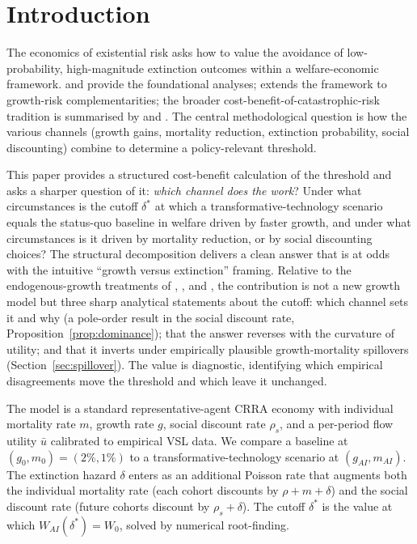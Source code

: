 \documentclass{_latex/house}
\begin{document}
\section{Introduction}
\label{sec:intro}

The economics of existential risk asks how to value the avoidance of low-probability, high-magnitude extinction outcomes within a welfare-economic framework. \citet{aschenbrenner2020existential} and \citet{trammell2020existential} provide the foundational analyses; \citet{jones2024aidilemma} extends the framework to growth-risk complementarities; the broader cost-benefit-of-catastrophic-risk tradition is summarised by \citet{posner2004catastrophe} and \citet{nordhaus2011economics}. The central methodological question is how the various channels (growth gains, mortality reduction, extinction probability, social discounting) combine to determine a policy-relevant threshold.

This paper provides a structured cost-benefit calculation of the threshold and asks a sharper question of it: \emph{which channel does the work}? Under what circumstances is the cutoff $\delta^*$ at which a transformative-technology scenario equals the status-quo baseline in welfare driven by faster growth, and under what circumstances is it driven by mortality reduction, or by social discounting choices? The structural decomposition delivers a clean answer that is at odds with the intuitive ``growth versus extinction'' framing. Relative to the endogenous-growth treatments of \citet{aschenbrenner2020existential}, \citet{trammell2020existential}, and \citet{jones2024aidilemma}, the contribution is not a new growth model but three sharp analytical statements about the cutoff: which channel sets it and why (a pole-order result in the social discount rate, Proposition~\ref{prop:dominance}); that the answer reverses with the curvature of utility; and that it inverts under empirically plausible growth-mortality spillovers (Section~\ref{sec:spillover}). The value is diagnostic, identifying which empirical disagreements move the threshold and which leave it unchanged.

The model is a standard representative-agent CRRA economy with individual mortality rate $m$, growth rate $g$, social discount rate $\rho_s$, and a per-period flow utility $\bar u$ calibrated to empirical VSL data. We compare a baseline at $(g_0, m_0) = (2\%, 1\%)$ to a transformative-technology scenario at $(g_{AI}, m_{AI})$. The extinction hazard $\delta$ enters as an additional Poisson rate that augments both the individual mortality rate (each cohort discounts by $\rho + m + \delta$) and the social discount rate (future cohorts discount by $\rho_s + \delta$). The cutoff $\delta^*$ is the value at which $W_{AI}(\delta^*) = W_0$, solved by numerical root-finding.
\end{document}
